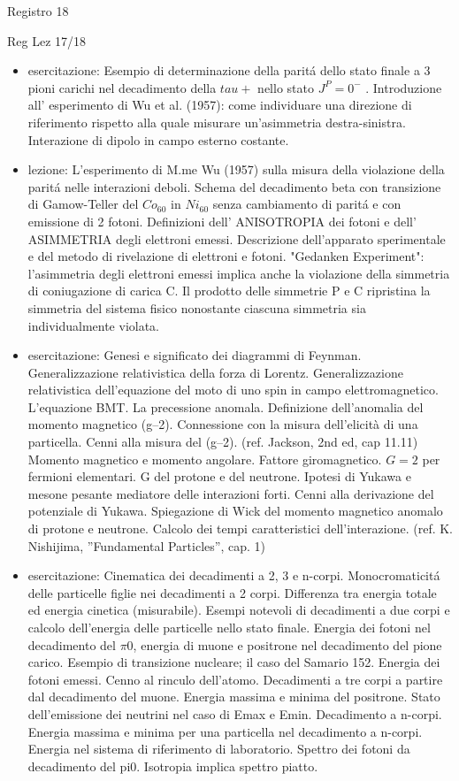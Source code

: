 \begin{frame}{Registro 18}
\begin{frame}[allowframebreaks]{Reg Lez 17/18}
\begin{itemize}
\item esercitazione: Esempio di determinazione della parit\'a dello stato finale a 3 pioni carichi nel decadimento della $tau+$ nello stato $J^P=0^-$ . Introduzione all' esperimento di Wu et al. (1957): come individuare una direzione di riferimento rispetto alla quale misurare un'asimmetria destra-sinistra. Interazione di dipolo in campo esterno costante.

\item lezione: L'esperimento di M.me Wu (1957) sulla misura della violazione della parit\'a nelle interazioni deboli. Schema del decadimento beta con transizione di Gamow-Teller del $Co_{60}$ in $Ni_{60}$ senza cambiamento di parit\'a e con emissione di 2 fotoni. Definizioni dell' ANISOTROPIA dei fotoni e dell' ASIMMETRIA degli elettroni emessi. Descrizione dell'apparato sperimentale e del metodo di rivelazione di elettroni e fotoni. "Gedanken Experiment": l'asimmetria degli elettroni emessi implica anche la violazione della simmetria di coniugazione di carica C. Il prodotto delle simmetrie P e C ripristina la simmetria del sistema fisico nonostante ciascuna simmetria sia individualmente violata.

\item esercitazione: Genesi e significato dei diagrammi di Feynman. Generalizzazione relativistica della forza di Lorentz. Generalizzazione relativistica dell'equazione del moto di uno spin in campo elettromagnetico. L'equazione BMT. La precessione anomala. Definizione dell'anomalia del momento magnetico (g–2). Connessione con la misura dell'elicità di una particella. Cenni alla misura del (g–2). (ref. Jackson, 2nd ed, cap 11.11) Momento magnetico e momento angolare. Fattore giromagnetico. $G=2$ per fermioni elementari. G del protone e del neutrone. Ipotesi di Yukawa e mesone pesante mediatore delle interazioni forti. Cenni alla derivazione del potenziale di Yukawa. Spiegazione di Wick del momento magnetico anomalo di protone e neutrone. Calcolo dei tempi caratteristici dell'interazione. (ref. K. Nishijima, ''Fundamental Particles'', cap. 1)

\item esercitazione: Cinematica dei decadimenti a 2, 3 e n-corpi. Monocromaticit\'a delle particelle figlie nei decadimenti a 2 corpi. Differenza tra energia totale ed energia cinetica (misurabile). Esempi notevoli di decadimenti a due corpi e calcolo dell'energia delle particelle nello stato finale. Energia dei fotoni nel decadimento del $\pi0$, energia di muone e positrone nel decadimento del pione carico. Esempio di transizione nucleare; il caso del Samario 152. Energia dei fotoni emessi. Cenno al rinculo dell'atomo. Decadimenti a tre corpi a partire dal decadimento del muone. Energia massima e minima del positrone. Stato dell'emissione dei neutrini nel caso di Emax e Emin. Decadimento a n-corpi. Energia massima e minima per una particella nel decadimento a n-corpi. Energia nel sistema di riferimento di laboratorio. Spettro dei fotoni da decadimento del pi0. Isotropia implica spettro piatto.


\end{itemize}
\end{frame}
\end{frame}

